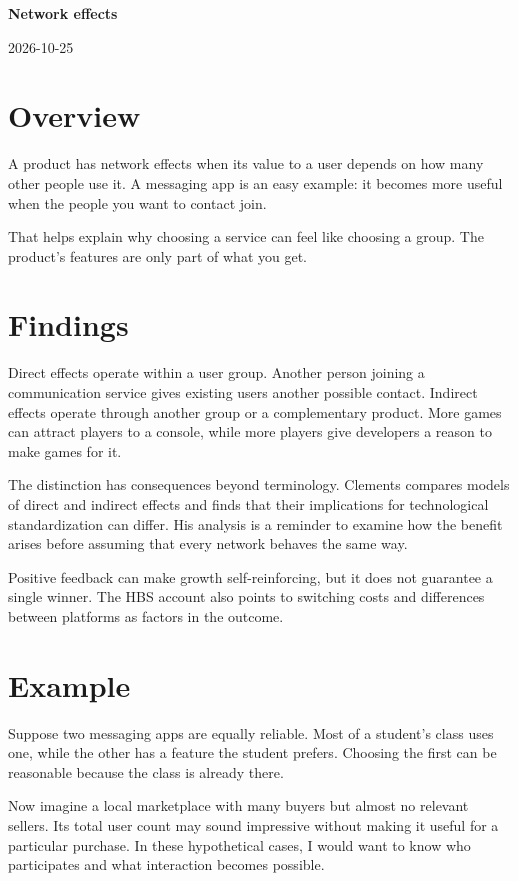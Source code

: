 \documentclass[11pt,a4paper]{article}
\newcommand{\researchtitle}{Network effects}
\newcommand{\researchdate}{2026-10-25}
\begin{document}
{\LARGE\bfseries\researchtitle\par}
\vspace{0.4em}
{\small\researchdate\par}

\section{Overview}

A product has network effects when its value to a user depends on how many
other people use it. A messaging app is an easy example: it becomes more
useful when the people you want to contact join. \cite{hbs}

That helps explain why choosing a service can feel like choosing a group.
The product's features are only part of what you get.

\section{Findings}

Direct effects operate within a user group. Another person joining a
communication service gives existing users another possible contact.
Indirect effects operate through another group or a complementary
product. More games can attract players to a console, while more players
give developers a reason to make games for it. \cite{hbs}

The distinction has consequences beyond terminology. Clements compares
models of direct and indirect effects and finds that their implications
for technological standardization can differ. His analysis is a reminder
to examine how the benefit arises before assuming that every network
behaves the same way. \cite{clements}

Positive feedback can make growth self-reinforcing, but it does not
guarantee a single winner. The HBS account also points to switching costs
and differences between platforms as factors in the outcome. \cite{hbs}

\section{Example}

Suppose two messaging apps are equally reliable. Most of a student's
class uses one, while the other has a feature the student prefers.
Choosing the first can be reasonable because the class is already there.

Now imagine a local marketplace with many buyers but almost no relevant
sellers. Its total user count may sound impressive without making it
useful for a particular purchase. In these hypothetical cases, I would
want to know who participates and what interaction becomes possible.
\end{document}
